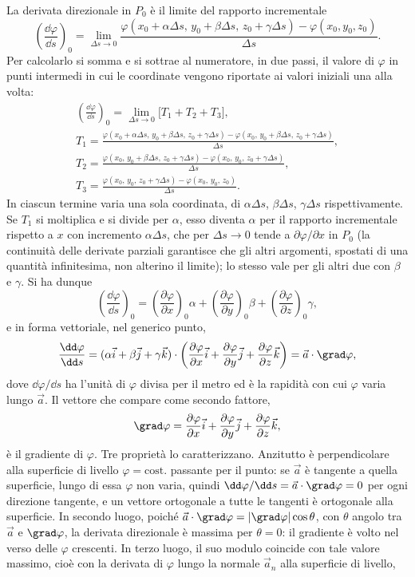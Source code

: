 \documentclass[main.tex]{subfiles}
\begin{document}
La derivata direzionale in $P_0$ è il limite del rapporto incrementale
\[
\left(\frac{\dd\varphi}{\dd s}\right)_0=\lim_{\Delta s\to0}\frac{\varphi(x_0+\alpha\Delta s,\,y_0+\beta\Delta s,\,z_0+\gamma\Delta s)-\varphi(x_0,y_0,z_0)}{\Delta s}.
\]
Per calcolarlo si somma e si sottrae al numeratore, in due passi, il valore di $\varphi$ in punti intermedi in cui le coordinate vengono riportate ai valori iniziali una alla volta:
\begin{gather*}
\left(\frac{\dd\varphi}{\dd s}\right)_0=\lim_{\Delta s\to0}\bigl[T_1+T_2+T_3\bigr],\\[4pt]
T_1=\frac{\varphi(x_0+\alpha\Delta s,\,y_0+\beta\Delta s,\,z_0+\gamma\Delta s)-\varphi(x_0,\,y_0+\beta\Delta s,\,z_0+\gamma\Delta s)}{\Delta s},\\[4pt]
T_2=\frac{\varphi(x_0,\,y_0+\beta\Delta s,\,z_0+\gamma\Delta s)-\varphi(x_0,\,y_0,\,z_0+\gamma\Delta s)}{\Delta s},\\[4pt]
T_3=\frac{\varphi(x_0,\,y_0,\,z_0+\gamma\Delta s)-\varphi(x_0,\,y_0,\,z_0)}{\Delta s}.
\end{gather*}
In ciascun termine varia una sola coordinata, di $\alpha\Delta s$, $\beta\Delta s$, $\gamma\Delta s$ rispettivamente. Se $T_1$ si moltiplica e si divide per $\alpha$, esso diventa $\alpha$ per il rapporto incrementale rispetto a $x$ con incremento $\alpha\Delta s$, che per $\Delta s\to0$ tende a $\partial\varphi/\partial x$ in $P_0$ (la continuità delle derivate parziali garantisce che gli altri argomenti, spostati di una quantità infinitesima, non alterino il limite); lo stesso vale per gli altri due con $\beta$ e $\gamma$. Si ha dunque
\[
\left(\frac{\dd\varphi}{\dd s}\right)_0=\left(\frac{\partial\varphi}{\partial x}\right)_0\alpha+\left(\frac{\partial\varphi}{\partial y}\right)_0\beta+\left(\frac{\partial\varphi}{\partial z}\right)_0\gamma ,
\]
e in forma vettoriale, nel generico punto,
\[
\frac{\dd\varphi}{\dd s}=(\alpha\vec i+\beta\vec j+\gamma\vec k)\cdot\left(\frac{\partial\varphi}{\partial x}\vec i+\frac{\partial\varphi}{\partial y}\vec j+\frac{\partial\varphi}{\partial z}\vec k\right)=\vec a\cdot\grad\varphi ,
\]
dove $\dd\varphi/\dd s$ ha l'unità di $\varphi$ divisa per il metro ed è la rapidità con cui $\varphi$ varia lungo $\vec a$. Il vettore che compare come secondo fattore,
\[
\grad\varphi=\frac{\partial\varphi}{\partial x}\vec i+\frac{\partial\varphi}{\partial y}\vec j+\frac{\partial\varphi}{\partial z}\vec k ,
\]
è il gradiente di $\varphi$. Tre proprietà lo caratterizzano. Anzitutto è perpendicolare alla superficie di livello $\varphi=\mathrm{cost.}$ passante per il punto: se $\vec a$ è tangente a quella superficie, lungo di essa $\varphi$ non varia, quindi $\dd\varphi/\dd s=\vec a\cdot\grad\varphi=0$ per ogni direzione tangente, e un vettore ortogonale a tutte le tangenti è ortogonale alla superficie. In secondo luogo, poiché $\vec a\cdot\grad\varphi=|\grad\varphi|\cos\theta$, con $\theta$ angolo tra $\vec a$ e $\grad\varphi$, la derivata direzionale è massima per $\theta=0$: il gradiente è volto nel verso delle $\varphi$ crescenti. In terzo luogo, il suo modulo coincide con tale valore massimo, cioè con la derivata di $\varphi$ lungo la normale $\vec a_n$ alla superficie di livello,
\end{document}
